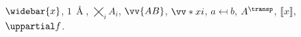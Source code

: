 \documentclass{article}
\begin{document}
$\widebar{x}$, $1\,\Angstrom$, $\bigtimes_{i} A_i$, $\vv{AB}$, $\vv*{x}{i}$, $a \mapsfrom b$, $A^{\transp}$, $\lBrack x \rBrack$, $\uppartial f$.
\end{document}
